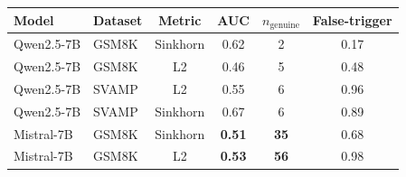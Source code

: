 \begin{tabular}{llcccc}
\toprule
\bf Model & \bf Dataset & \bf Metric & \bf AUC & \bf $n_{\text{genuine}}$ & \bf False-trigger \\
\midrule
Qwen2.5-7B & GSM8K & Sinkhorn & 0.62 & 2 & 0.17 \\
Qwen2.5-7B & GSM8K & L2 & 0.46 & 5 & 0.48 \\
Qwen2.5-7B & SVAMP & L2 & 0.55 & 6 & 0.96 \\
Qwen2.5-7B & SVAMP & Sinkhorn & 0.67 & 6 & 0.89 \\
Mistral-7B & GSM8K & Sinkhorn & \bf 0.51 & \bf 35 & 0.68 \\
Mistral-7B & GSM8K & L2 & \bf 0.53 & \bf 56 & 0.98 \\
\bottomrule
\end{tabular}
